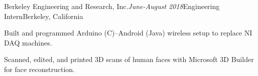 \begin{rSubsection}{Berkeley Engineering and Research, Inc.}{\em June-August 2018}{Engineering Intern}{Berkeley, California}

\item Built and programmed Arduino (C)--Android (Java) wireless setup to replace NI DAQ machines.
\item Scanned, edited, and printed 3D scans of human faces with Microsoft 3D Builder for face reconstruction.
\end{rSubsection}
